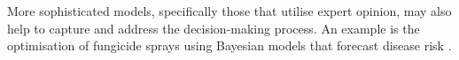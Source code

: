 \documentclass[review,12pt,authoryear]{elsarticle}
\begin{document}
\begin{linenumbers}
More sophisticated models, specifically those that utilise expert opinion, may also help to capture and address the decision-making process. An example is the optimisation of fungicide sprays using Bayesian models that forecast disease risk \citep{luDiseaseRiskForecasting2020}. 
\par












\end{linenumbers}
\end{document}
